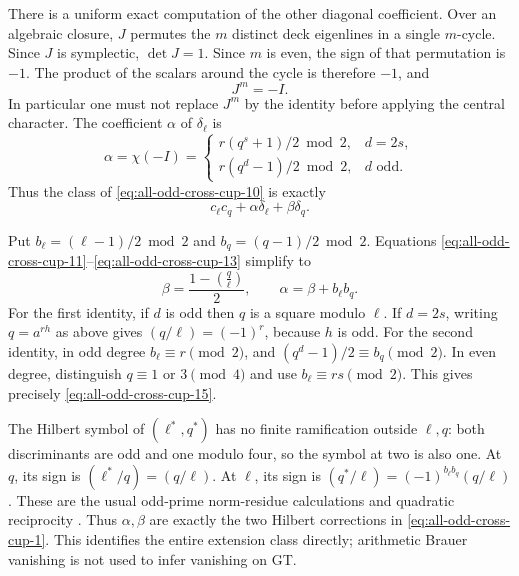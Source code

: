 There is a uniform exact computation of the other
diagonal coefficient. Over an algebraic closure,
\(J\) permutes the \(m\) distinct deck eigenlines
in a single \(m\)-cycle.
Since \(J\) is symplectic, \(\det J=1\).
Since \(m\) is even, the sign of that permutation
is \(-1\). The product of the scalars around the
cycle is therefore \(-1\), and
\begin{equation}
                                J^m=-I.                   \label{eq:all-odd-cross-cup-12}
\end{equation}
In particular one must not replace \(J^m\) by the
identity before applying the central character.
The coefficient \(\alpha\) of \(\delta_\ell\) is
\begin{equation}
 \alpha=\chi(-I)=
 \begin{cases}
 r(q^s+1)/2\bmod2,&d=2s,\\
 r(q^d-1)/2\bmod2,&d\text{ odd}.
 \end{cases}                                               \label{eq:all-odd-cross-cup-13}
\end{equation}
Thus the class of \eqref{eq:all-odd-cross-cup-10} is exactly
\begin{equation}
                     c_\ell c_q+\alpha\delta_\ell+\beta\delta_q.
                                                               \label{eq:all-odd-cross-cup-14}
\end{equation}

Put \(b_\ell=(\ell-1)/2\bmod2\) and
\(b_q=(q-1)/2\bmod2\).
Equations \eqref{eq:all-odd-cross-cup-11}--\eqref{eq:all-odd-cross-cup-13} simplify to
\begin{equation}
 \beta=\frac{1-\left(\frac q\ell\right)}2,\qquad
                         \alpha=\beta+b_\ell b_q.          \label{eq:all-odd-cross-cup-15}
\end{equation}
For the first identity, if \(d\) is odd then \(q\)
is a square modulo \(\ell\).
If \(d=2s\), writing \(q=a^{rh}\) as above gives
\((q/\ell)=(-1)^r\), because \(h\) is odd.
For the second identity, in odd degree
\(b_\ell\equiv r\pmod2\), and
\((q^d-1)/2\equiv b_q\pmod2\).
In even degree, distinguish \(q\equiv1\) or \(3\pmod4\)
and use \(b_\ell\equiv rs\pmod2\).
This gives precisely \eqref{eq:all-odd-cross-cup-15}.

The Hilbert symbol of \((\ell^*,q^*)\) has no finite
ramification outside \(\ell,q\):
both discriminants are odd and one modulo four,
so the symbol at two is also one.
At \(q\), its sign is
\((\ell^*/q)=(q/\ell)\).
At \(\ell\), its sign is
\((q^*/\ell)=(-1)^{b_\ell b_q}(q/\ell)\).
These are the usual odd-prime norm-residue calculations
and quadratic reciprocity
\cite[III, Theorem~4.4, pp.~113--114; Remark~4.7, p.~115]{MilneCFT}.
Thus \(\alpha,\beta\) are exactly the two Hilbert
corrections in \eqref{eq:all-odd-cross-cup-1}.
This identifies the entire extension class directly;
arithmetic Brauer vanishing is not used to infer
vanishing on GT.

